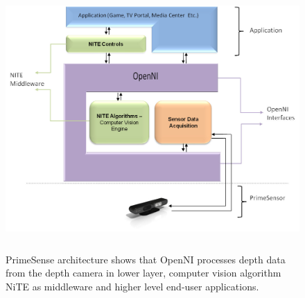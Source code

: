 \begin{figure}
	[h] \centering 
	\includegraphics[height=10cm]{figures/content/ni-arch.jpg} \caption{ PrimeSense architecture shows that OpenNI processes depth data from the depth camera in lower layer, computer vision algorithm NiTE as middleware and higher level end-user applications.  \cite{nite-spec} } \label{fg:ni:arch} 
\end{figure}
